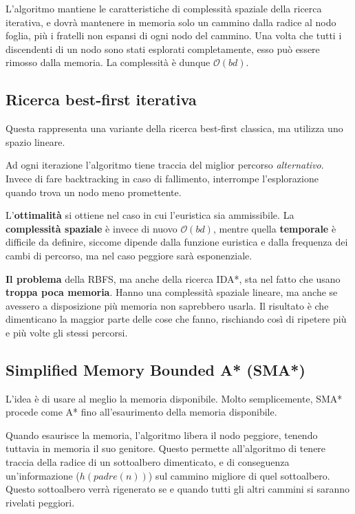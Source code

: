         L'algoritmo mantiene le caratteristiche di complessità spaziale della ricerca iterativa, e dovrà mantenere in memoria solo un cammino dalla radice al nodo foglia, più i fratelli non espansi di ogni nodo del cammino. Una volta che tutti i discendenti di un nodo sono stati esplorati completamente, esso può essere rimosso dalla memoria. La complessità è dunque $\mathcal{O}(bd)$.
        
    \subsection{Ricerca best-first iterativa}
        Questa rappresenta una variante della ricerca best-first classica, ma utilizza uno spazio lineare.
        
        Ad ogni iterazione l'algoritmo tiene traccia del miglior percorso \textit{alternativo}. Invece di fare backtracking in caso di fallimento, interrompe l'esplorazione quando trova un nodo meno promettente.
        
        L'\textbf{ottimalità} si ottiene nel caso in cui l'euristica sia ammissibile. La \textbf{complessità spaziale} è invece di nuovo $\mathcal{O}(bd)$, mentre quella \textbf{temporale} è difficile da definire, siccome dipende dalla funzione euristica e dalla frequenza dei cambi di percorso, ma nel caso peggiore sarà esponenziale.
        
        \textbf{Il problema }\color{black}della RBFS, ma anche della ricerca IDA*, sta nel fatto che usano \textbf{troppa poca memoria}. Hanno una complessità spaziale lineare, ma anche se avessero a disposizione più memoria non saprebbero usarla. Il risultato è che dimenticano la maggior parte delle cose che fanno, rischiando così di ripetere più e più volte gli stessi percorsi.
        
    \subsection{Simplified Memory Bounded A* (SMA*)}
        L'idea è di usare al meglio la memoria disponibile. Molto semplicemente, SMA* procede come A* fino all'esaurimento della memoria disponibile.
        
        Quando esaurisce la memoria, l'algoritmo libera il nodo peggiore, tenendo tuttavia in memoria il suo genitore. Questo permette all'algoritmo di tenere traccia della radice di un sottoalbero dimenticato, e di conseguenza un'informazione ($h(padre(n))$) sul cammino migliore di quel sottoalbero. Questo sottoalbero verrà rigenerato se e quando tutti gli altri cammini si saranno rivelati peggiori.
        
